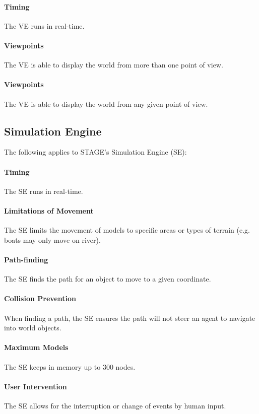 \documentclass[titlepage]{article}
\begin{document}
    \paragraph{Timing} The VE runs in real-time.
    \paragraph{Viewpoints} The VE is able to display the world from more than one point of view.
    \paragraph{Viewpoints} The VE is able to display the world from any given point of view.

\subsection{Simulation Engine}
	The following applies to STAGE's Simulation Engine (SE):
    \paragraph{Timing} The SE runs in real-time.
    \paragraph{Limitations of Movement} The SE limits the movement of models to specific areas or types of terrain (e.g. boats may only move on river).
    \paragraph{Path-finding} The SE finds the path for an object to move to a given coordinate.
    \paragraph{Collision Prevention} When finding a path, the SE ensures the path will not steer an agent to navigate into world objects.
    \paragraph{Maximum Models} The SE keeps in memory up to 300 nodes.
    \paragraph{User Intervention} The SE allows for the interruption or change of events by human input.
\end{document}
